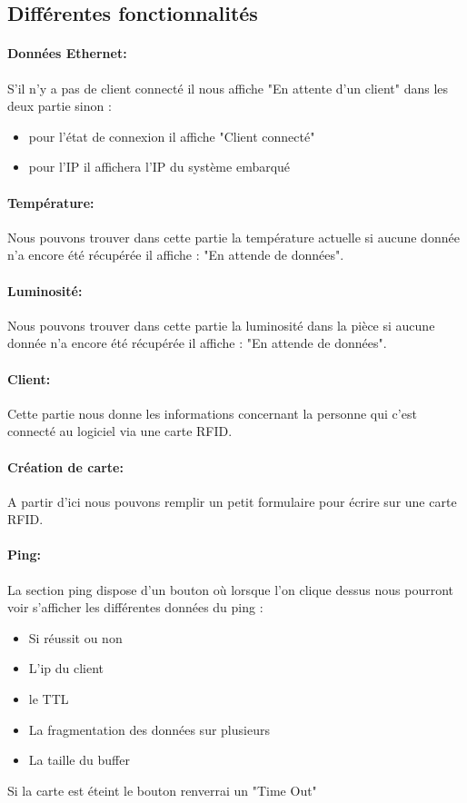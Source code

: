 \documentclass[12pt,a4paper]{report}
\begin{document}
		
		\subsection{Différentes fonctionnalités}
			\paragraph{Données Ethernet:}S'il n'y a pas de client connecté il nous affiche "En attente d'un client" dans les deux partie sinon :
			\begin{itemize}
			\item pour l'état de connexion il affiche "Client connecté" 
			\item pour l'IP il affichera l'IP du système embarqué			
			\end{itemize}
			\paragraph{Température:}Nous pouvons trouver dans cette partie la température actuelle si aucune donnée n'a encore été récupérée il affiche : "En attende de données".
			\paragraph{Luminosité:}Nous pouvons trouver dans cette partie la luminosité dans la pièce si aucune donnée n'a encore été récupérée il affiche : "En attende de données".
			\paragraph{Client:}Cette partie nous donne les informations concernant la personne qui c'est connecté au logiciel via une carte RFID.
			\paragraph{Création de carte:}A partir d'ici nous pouvons remplir un petit formulaire pour écrire sur une carte RFID.
			\paragraph{Ping:}La section ping dispose d'un bouton où lorsque l'on clique dessus nous pourront voir s'afficher les différentes données du ping : 
			\begin{itemize}
			\item Si réussit ou non
			\item L'ip du client
			\item le TTL
			\item La fragmentation des données sur plusieurs
			\item La taille du buffer
			\end{itemize}
			Si la carte est éteint le bouton renverrai un "Time Out"
\end{document}
